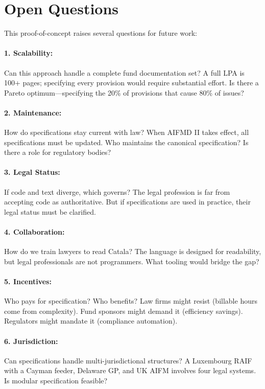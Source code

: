 
\section{Open Questions}
\label{sec:questions}

This proof-of-concept raises several questions for future work:

\paragraph{1. Scalability:} Can this approach handle a complete fund documentation set? A full LPA is 100+ pages; specifying every provision would require substantial effort. Is there a Pareto optimum---specifying the 20\% of provisions that cause 80\% of issues?

\paragraph{2. Maintenance:} How do specifications stay current with law? When AIFMD II takes effect, all specifications must be updated. Who maintains the canonical specification? Is there a role for regulatory bodies?

\paragraph{3. Legal Status:} If code and text diverge, which governs? The legal profession is far from accepting code as authoritative. But if specifications are used in practice, their legal status must be clarified.

\paragraph{4. Collaboration:} How do we train lawyers to read Catala? The language is designed for readability, but legal professionals are not programmers. What tooling would bridge the gap?

\paragraph{5. Incentives:} Who pays for specification? Who benefits? Law firms might resist (billable hours come from complexity). Fund sponsors might demand it (efficiency savings). Regulators might mandate it (compliance automation).

\paragraph{6. Jurisdiction:} Can specifications handle multi-jurisdictional structures? A Luxembourg RAIF with a Cayman feeder, Delaware GP, and UK AIFM involves four legal systems. Is modular specification feasible?

